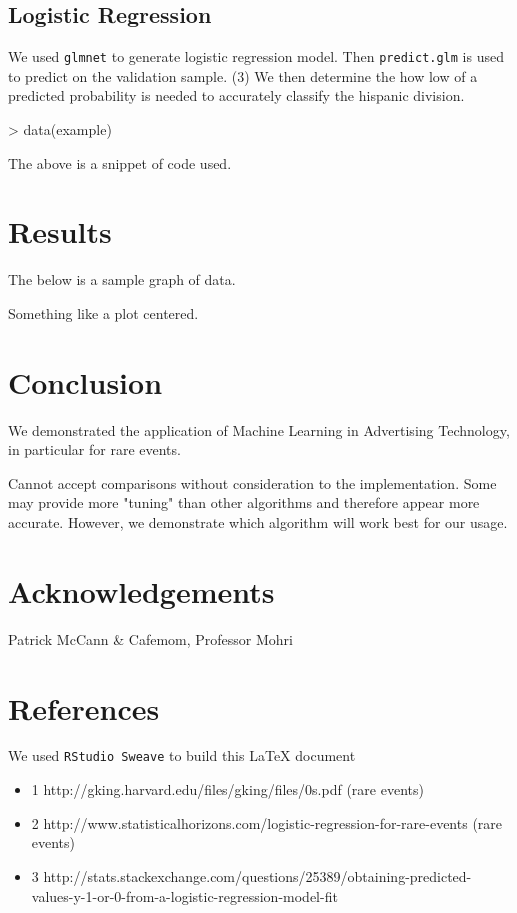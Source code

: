 \documentclass[a4paper]{article}
\begin{document}
\begin{multicols}{2}
\subsection*{Logistic Regression}
We used \texttt{glmnet} to generate logistic regression model.
Then \texttt{predict.glm} is used to predict on the validation sample.
(3) We then determine the how low of a predicted probability is needed to accurately classify the hispanic division.

\begin{Schunk}
\begin{Sinput}
> data(example)
\end{Sinput}
\end{Schunk}
The above is a snippet of code used. 

\section*{Results}
The below is a sample graph of data.
\begin{center}
Something like a plot centered.
\end{center}

\section*{Conclusion}
We demonstrated the application of Machine Learning in Advertising Technology, in particular for rare events.

Cannot accept comparisons without consideration to the implementation. Some may provide more "tuning" than other algorithms and therefore appear more accurate. However, we demonstrate which algorithm will work best for our usage.

\section*{Acknowledgements}
Patrick McCann \& Cafemom, Professor Mohri

\end{multicols}


\section*{References}
We used \texttt{RStudio Sweave} to build this \LaTeX{} document
\begin{itemize}
  \item 1 http://gking.harvard.edu/files/gking/files/0s.pdf (rare events)
  \item 2 http://www.statisticalhorizons.com/logistic-regression-for-rare-events (rare events)
  \item 3 http://stats.stackexchange.com/questions/25389/obtaining-predicted-values-y-1-or-0-from-a-logistic-regression-model-fit
\end{itemize}
\end{document}
